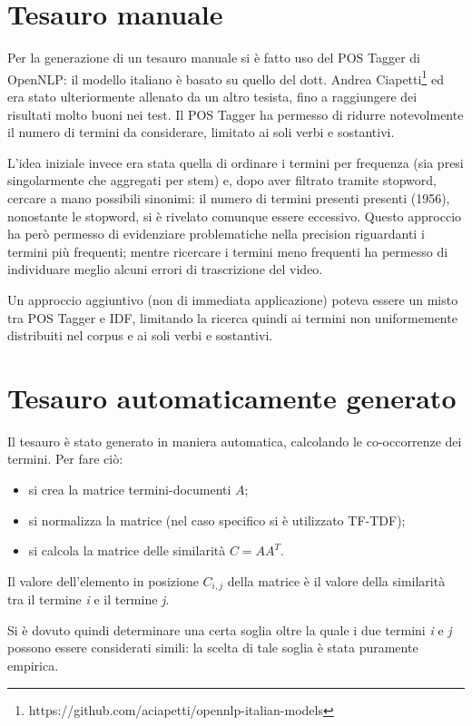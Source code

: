 \section{Tesauro manuale}
Per la generazione di un tesauro manuale si è fatto uso del POS Tagger di OpenNLP: il modello italiano è basato su quello del dott. Andrea Ciapetti\footnote{https://github.com/aciapetti/opennlp-italian-models} ed era stato ulteriormente allenato da un altro tesista, fino a raggiungere dei risultati molto buoni nei test. Il POS Tagger ha permesso di ridurre notevolmente il numero di termini da considerare, limitato ai soli verbi e sostantivi.

L'idea iniziale invece era stata quella di ordinare i termini per frequenza (sia presi singolarmente che aggregati per stem) e, dopo aver filtrato tramite stopword, cercare a mano possibili sinonimi: il numero di termini presenti presenti (1956), nonostante le stopword, si è rivelato comunque essere eccessivo. Questo approccio ha però permesso di evidenziare problematiche nella precision riguardanti i termini più frequenti; mentre ricercare i termini meno frequenti ha permesso di individuare meglio alcuni errori di trascrizione del video.

Un approccio aggiuntivo (non di immediata applicazione) poteva essere un misto tra POS Tagger e IDF, limitando la ricerca quindi ai termini non uniformemente distribuiti nel corpus e ai soli verbi e sostantivi.

\section{Tesauro automaticamente generato}
Il tesauro è stato generato in maniera automatica, calcolando le co-occorrenze dei termini.
Per fare ciò:
\begin{itemize}
    \item si crea la matrice termini-documenti $A$;
    \item si normalizza la matrice (nel caso specifico si è utilizzato TF-TDF);
    \item si calcola la matrice delle similarità $C = AA^{T}$.
\end{itemize}

Il valore dell'elemento in posizione $C_{i,j}$ della matrice è il valore della similarità tra il termine \textit{i} e il termine \textit{j}.

Si è dovuto quindi determinare una certa soglia oltre la quale i due termini \textit{i} e \textit{j} possono essere considerati simili: la scelta di tale soglia è stata puramente empirica.

